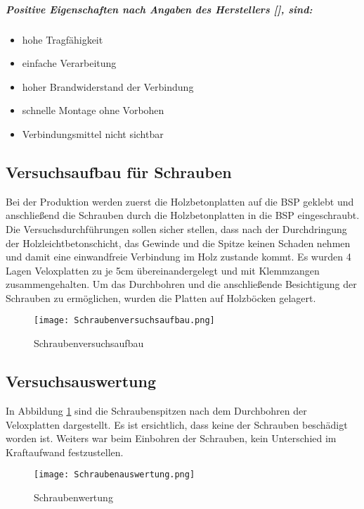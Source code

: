 \documentclass[12 pt,a4 paper ]{scrreprt}
\begin{document}
\subparagraph{Positive Eigenschaften nach Angaben des Herstellers [], sind:}

\begin{itemize}
	\item hohe Tragfähigkeit
	\item einfache Verarbeitung
	\item hoher Brandwiderstand der Verbindung
	\item schnelle Montage ohne Vorbohen
	\item Verbindungsmittel nicht sichtbar
\end{itemize}

\subsection{Versuchsaufbau für Schrauben}

Bei der Produktion werden zuerst die Holzbetonplatten auf die BSP geklebt und anschließend die Schrauben durch die Holzbetonplatten in die BSP eingeschraubt. Die Versuchsdurchführungen sollen sicher stellen, dass nach der Durchdringung der Holzleichtbetonschicht, das Gewinde und die Spitze keinen Schaden nehmen und damit eine einwandfreie Verbindung im Holz zustande kommt. \newline Es wurden 4 Lagen Veloxplatten zu je 5cm übereinandergelegt und mit Klemmzangen zusammengehalten. Um das Durchbohren und die anschließende Besichtigung der Schrauben zu ermöglichen, wurden die Platten auf Holzböcken gelagert.  

\begin{figure}
\begin{center}
\texttt{[image: Schraubenversuchsaufbau.png]}
\caption{ Schraubenversuchsaufbau}
\end{center}
\end{figure}

\subsection{Versuchsauswertung}

In Abbildung \ref{Schraubenauswertung} sind die Schraubenspitzen nach dem Durchbohren der Veloxplatten dargestellt. Es ist ersichtlich, dass keine der Schrauben beschädigt worden ist. Weiters war beim Einbohren der Schrauben, kein Unterschied im Kraftaufwand festzustellen. 

\begin{figure}[h!]
\begin{center}
\texttt{[image: Schraubenauswertung.png]}
\caption{ Schraubenwertung}
\label{Schraubenauswertung}
\end{center}
\end{figure}
\end{document}
